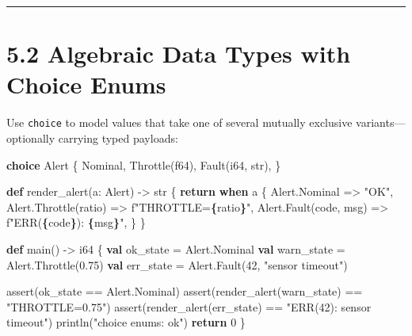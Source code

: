 \documentclass[
  english,
  oneside]{book}
\newenvironment{Shaded}{\begin{snugshade}}{\end{snugshade}}
\newcommand{\ControlFlowTok}[1]{\textcolor[rgb]{0.77,0.53,0.75}{\textbf{#1}}}
\newcommand{\DataTypeTok}[1]{\textcolor[rgb]{0.31,0.79,0.69}{#1}}
\newcommand{\DecValTok}[1]{\textcolor[rgb]{0.71,0.81,0.66}{#1}}
\newcommand{\FloatTok}[1]{\textcolor[rgb]{0.71,0.81,0.66}{#1}}
\newcommand{\FunctionTok}[1]{\textcolor[rgb]{0.86,0.86,0.67}{#1}}
\newcommand{\KeywordTok}[1]{\textcolor[rgb]{0.34,0.61,0.84}{\textbf{#1}}}
\newcommand{\NormalTok}[1]{\textcolor[rgb]{0.83,0.83,0.83}{#1}}
\newcommand{\OperatorTok}[1]{\textcolor[rgb]{0.83,0.83,0.83}{#1}}
\newcommand{\StringTok}[1]{\textcolor[rgb]{0.81,0.57,0.47}{#1}}
\begin{document}
\begin{center}\rule{0.5\linewidth}{0.5pt}\end{center}

\section{5.2 Algebraic Data Types with Choice
Enums}\label{algebraic-data-types-with-choice-enums}

Use \texttt{choice} to model values that take one of several mutually
exclusive variants---optionally carrying typed payloads:

\begin{Shaded}
\begin{Highlighting}[]
\KeywordTok{choice}\NormalTok{ Alert \{}
\NormalTok{    Nominal,}
\NormalTok{    Throttle(}\DataTypeTok{f64}\NormalTok{),}
\NormalTok{    Fault(}\DataTypeTok{i64}\NormalTok{, }\DataTypeTok{str}\NormalTok{),}
\NormalTok{\}}

\KeywordTok{def}\NormalTok{ render\_alert(a: Alert) }\OperatorTok{{-}\textgreater{}} \DataTypeTok{str}\NormalTok{ \{}
    \ControlFlowTok{return} \ControlFlowTok{when}\NormalTok{ a \{}
\NormalTok{        Alert}\OperatorTok{.}\NormalTok{Nominal }\OperatorTok{=\textgreater{}} \StringTok{"OK"}\NormalTok{,}
\NormalTok{        Alert}\OperatorTok{.}\NormalTok{Throttle(ratio) }\OperatorTok{=\textgreater{}} \StringTok{f"THROTTLE=}\ControlFlowTok{\{}\NormalTok{ratio}\ControlFlowTok{\}}\StringTok{"}\NormalTok{,}
\NormalTok{        Alert}\OperatorTok{.}\NormalTok{Fault(code, msg) }\OperatorTok{=\textgreater{}} \StringTok{f"ERR(}\ControlFlowTok{\{}\NormalTok{code}\ControlFlowTok{\}}\StringTok{): }\ControlFlowTok{\{}\NormalTok{msg}\ControlFlowTok{\}}\StringTok{"}\NormalTok{,}
\NormalTok{    \}}
\NormalTok{\}}

\KeywordTok{def}\NormalTok{ main() }\OperatorTok{{-}\textgreater{}} \DataTypeTok{i64}\NormalTok{ \{}
    \KeywordTok{val}\NormalTok{ ok\_state }\OperatorTok{=}\NormalTok{ Alert}\OperatorTok{.}\NormalTok{Nominal}
    \KeywordTok{val}\NormalTok{ warn\_state }\OperatorTok{=}\NormalTok{ Alert}\OperatorTok{.}\NormalTok{Throttle(}\FloatTok{0.75}\NormalTok{)}
    \KeywordTok{val}\NormalTok{ err\_state }\OperatorTok{=}\NormalTok{ Alert}\OperatorTok{.}\NormalTok{Fault(}\DecValTok{42}\NormalTok{, }\StringTok{"sensor timeout"}\NormalTok{)}

    \FunctionTok{assert}\NormalTok{(ok\_state }\OperatorTok{==}\NormalTok{ Alert}\OperatorTok{.}\NormalTok{Nominal)}
    \FunctionTok{assert}\NormalTok{(render\_alert(warn\_state) }\OperatorTok{==} \StringTok{"THROTTLE=0.75"}\NormalTok{)}
    \FunctionTok{assert}\NormalTok{(render\_alert(err\_state) }\OperatorTok{==} \StringTok{"ERR(42): sensor timeout"}\NormalTok{)}
\NormalTok{    println(}\StringTok{"choice enums: ok"}\NormalTok{)}
    \ControlFlowTok{return} \DecValTok{0}
\NormalTok{\}}
\end{Highlighting}
\end{Shaded}
\end{document}
